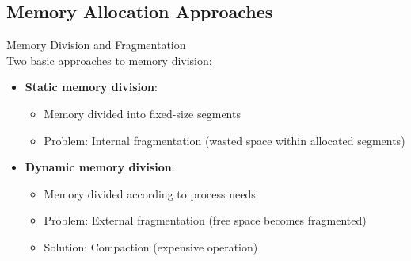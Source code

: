 \subsection{Memory Allocation Approaches}

\begin{definition}{Memory Division and Fragmentation}\\
    Two basic approaches to memory division:
    \begin{itemize}
        \item \textbf{Static memory division}:
            \begin{itemize}
                \item Memory divided into fixed-size segments
                \item Problem: Internal fragmentation (wasted space within allocated segments)
            \end{itemize}
        \item \textbf{Dynamic memory division}:
            \begin{itemize}
                \item Memory divided according to process needs
                \item Problem: External fragmentation (free space becomes fragmented)
                \item Solution: Compaction (expensive operation)
            \end{itemize}
    \end{itemize}
\end{definition}

